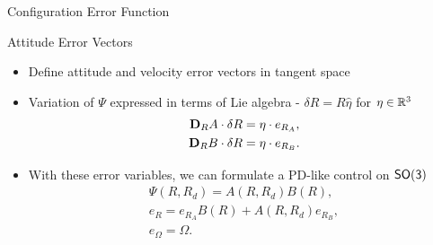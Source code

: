 \begin{frame}{Configuration Error Function}
\end{frame}   %

\begin{frame}{Attitude Error Vectors} %
    \begin{itemize}
        \item Define attitude and velocity error vectors in tangent space 
        \item Variation of \( \Psi \) expressed in terms of Lie algebra - \( \delta R = R \hat{\eta} \) for \( \eta \in \mathbb{R}^3 \)
        \begin{align*}
            \mathbf{D}_{R} A \cdot \delta R &= \eta \cdot e_{R_A} ,\\
            \mathbf{D}_{R} B \cdot \delta R &= \eta \cdot e_{R_{B}} . 
        \end{align*}
        \item With these error variables, we can formulate a PD-like control on \( \mathsf{SO(3)} \)
        \begin{gather*}
            \Psi(R, R_d) = A(R, R_d) B(R) , \label{eqn:psi} \\
            e_R = e_{R_A} B(R) + A(R,R_d) e_{R_B} , \label{eqn:eR} \\
            e_\Omega = \Omega .   \label{eqn:eW} 
        \end{gather*}
        
    
    \end{itemize}
    
\end{frame} %

